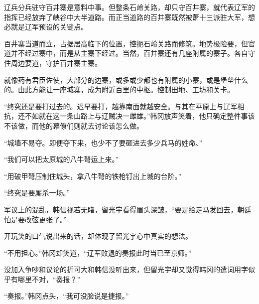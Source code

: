 辽兵分兵驻守百井寨是意料中事。但整条石岭关路，却只守百井寨，就代表辽军的指挥已经放弃了峡谷中大半道路。而正当道路的百井寨既然被萧十三派驻大军，想必就是辽军预设的关键点。

百井寨当道而立，占据居高临下的位置，控扼石岭关路而修筑。地势极险要，但官道并不经过寨中，而是从主寨下经过。当然，百井寨还有几座附属的寨子。各自守住周边要道，守护百井寨主寨。

就像药有君臣佐使，大部分的边寨，或多或少都也有附属的小寨，或是堡垒什么的。由此方能让一座城寨，成为附近百里的中枢。控制田地、工坊和关卡。

“终究还是要打过去的。迟早要打，越靠南面就越安全。与其在平原上与辽军相抗，还不如就在这一条山路上与辽贼决一雌雄。”韩冈放声笑着，他只确定整件事该不该做，而他的幕僚们则就去讨论该怎么做。

“城墙不易夺。即便夺下来，也少不了要砸进去多少兵马的姓命、”

“我们可以把太原城的八牛弩运上来。”

“用破甲弩压制住城头，拿八牛弩的铁枪钉出上城的台阶。”

“终究是要厮杀一场。”

军议上的混乱，韩信视若无睹，留光宇看得眉头深皱，“要是给走马发回去，朝廷怕是要改弦更张了。”

开玩笑的口气说出来的话，却体现了留光宇心中真实的想法。

“不用担心。”韩冈却笑道，“辽军败退的奏报此时当已至京师。”

没加入争吵和议论的折可大和韩信没听出来，但留光宇却又觉得韩冈的遣词用字似乎有哪里不对，“奏报？”

“奏报。”韩冈点头，“我可没脸说是捷报。”

